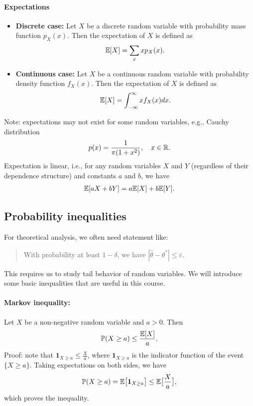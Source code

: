 \documentclass[11pt,letterpaper]{article}
\begin{document}
\paragraph{Expectations}
\begin{itemize}
  \item \textbf{Discrete case:} Let $X$ be a discrete random variable with probability mass function $p_X(x)$. Then the expectation of $X$ is defined as
  \begin{align*}
    {\mathbb{E}}[X] = \sum_{x} x p_X(x).
  \end{align*}
  \item \textbf{Continuous case:} Let $X$ be a continuous random variable with probability density function $f_X(x)$. Then the expectation of $X$ is defined as
  \begin{align*}
    {\mathbb{E}}[X] = \int_{-\infty}^{\infty} x f_X(x) dx.
  \end{align*}
\end{itemize}
Note: expectations may not exist for some random variables, e.g., Cauchy distribution
\begin{align*}
  p (x) = \frac{1}{\pi(1+x^2)}, \quad x \in \mathbb{R}.
\end{align*}
Expectation is linear, i.e., for any random variables $X$ and $Y$ (regardless of their dependence structure) and constants $a$ and $b$, we have
\begin{align*}
  {\mathbb{E}}[aX + bY] = a {\mathbb{E}}[X] + b {\mathbb{E}}[Y].
\end{align*}

\subsection{Probability inequalities}
For theoretical analysis, we often need statement like:
\begin{quote}
  With probability at least $1 - \delta$, we have $|\widehat{\theta} - \theta^*| \leq \varepsilon$.
\end{quote}
This requires us to study tail behavior of random variables. We will introduce some basic inequalities that are useful in this course.

\paragraph{Markov inequality:} Let $X$ be a non-negative random variable and $a > 0$. Then
\begin{align*}
  {\mathbb{P}}(X \geq a) \leq \frac{{\mathbb{E}}[X]}{a}.
\end{align*}
Proof: note that $\bm{1}_{X \geq a} \leq \frac{X}{a}$, where $\bm{1}_{X \geq a}$ is the indicator function of the event $\{X \geq a\}$. Taking expectations on both sides, we have
\begin{align*}
  {\mathbb{P}} (X \geq a) = {\mathbb{E}} \big[ \bm{1}_{X \geq a} \big] \leq {\mathbb{E}} \big[  \frac{X}{a}\big],
\end{align*}
which proves the inequality.
\end{document}

